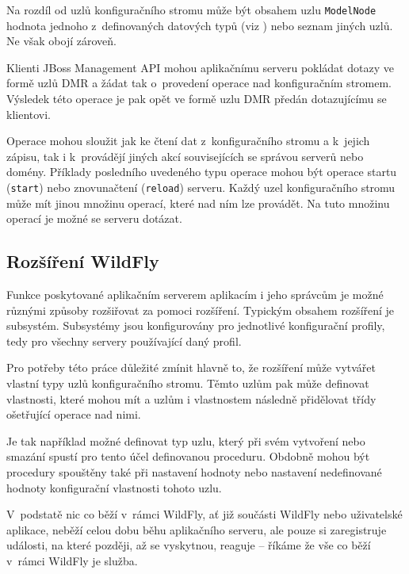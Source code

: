 Na rozdíl od uzlů konfiguračního stromu může být obsahem uzlu {\tt ModelNode} hodnota jednoho z~definovaných datových typů (viz \cite{jboss7slideShare}) nebo seznam jiných uzlů. Ne však obojí zároveň.
\cite{jboss7slideShare}

Klienti JBoss Management API mohou aplikačnímu serveru pokládat dotazy ve formě uzlů DMR a žádat tak o~provedení operace nad konfiguračním stromem.
Výsledek této operace je pak opět ve formě uzlu DMR předán dotazujícímu se klientovi.
\cite{jbossDetypedManagement}

Operace mohou sloužit jak ke čtení dat z~konfiguračního stromu a k~jejich zápisu, tak i k~provádějí jiných akcí souvisejících se správou serverů nebo domény.
Příklady posledního uvedeného typu operace mohou být operace startu ({\tt start}) nebo znovunačtení ({\tt reload}) serveru.
Každý uzel konfiguračního stromu může mít jinou množinu operací, které nad ním lze provádět.
Na tuto množinu operací je možné se serveru dotázat.
\cite{jbossDetypedManagement}

\subsection{Rozšíření WildFly} \label{rozsireniWildFly}

Funkce poskytované aplikačním serverem aplikacím i jeho správcům je možné různými způsoby rozšiřovat za pomoci rozšíření.
Typickým obsahem rozšíření je subsystém. Subsystémy jsou konfigurovány pro jednotlivé konfigurační profily, tedy pro všechny servery používající daný profil.

Pro potřeby této práce důležité zmínit hlavně to, že rozšíření může vytvářet vlastní typy uzlů konfiguračního stromu.
Těmto uzlům pak může definovat vlastnosti, které mohou mít a uzlům i vlastnostem následně přidělovat třídy ošetřující operace nad nimi.
\cite{WildFlyExtending}

Je tak například možné definovat typ uzlu, který při svém vytvoření nebo smazání spustí pro tento účel definovanou proceduru.
Obdobně mohou být procedury spouštěny také při nastavení hodnoty nebo nastavení nedefinované hodnoty konfigurační vlastnosti tohoto uzlu.

V~podstatě nic co běží v~rámci WildFly, ať již součásti WildFly nebo uživatelské aplikace, neběží celou dobu běhu aplikačního serveru, ale pouze si zaregistruje události, na které později, až se vyskytnou, reaguje -- říkáme že vše co běží v~rámci WildFly je služba. \cite{jboss7slideShare}

